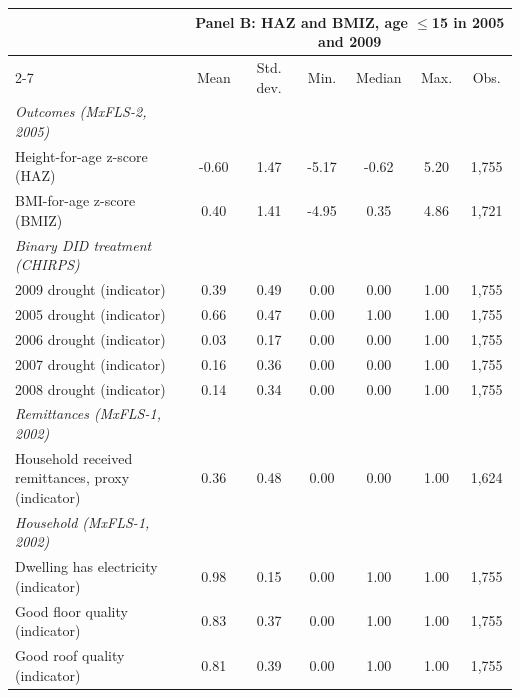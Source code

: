 \documentclass[12pt]{article}
\begin{document}
\begin{longtable}{l*{6}{c}}
\bottomrule
\newpage
\toprule
 & \multicolumn{6}{c}{Panel B: HAZ and BMIZ, age \ensuremath{\le}15 in 2005 and 2009}\\
\cmidrule(lr){2-7}
                    &        Mean&   Std. dev.&        Min.&      Median&        Max.&        Obs.\\
\midrule
\textit{Outcomes (MxFLS-2, 2005)}&            &            &            &            &            &            \\
Height-for-age z-score (HAZ)&       -0.60&        1.47&       -5.17&       -0.62&        5.20&       1,755\\
BMI-for-age z-score (BMIZ)&        0.40&        1.41&       -4.95&        0.35&        4.86&       1,721\\
\addlinespace[6pt]\textit{Binary DID treatment (CHIRPS)}&            &            &            &            &            &            \\
2009 drought (indicator)&        0.39&        0.49&        0.00&        0.00&        1.00&       1,755\\
2005 drought (indicator)&        0.66&        0.47&        0.00&        1.00&        1.00&       1,755\\
2006 drought (indicator)&        0.03&        0.17&        0.00&        0.00&        1.00&       1,755\\
2007 drought (indicator)&        0.16&        0.36&        0.00&        0.00&        1.00&       1,755\\
2008 drought (indicator)&        0.14&        0.34&        0.00&        0.00&        1.00&       1,755\\
\addlinespace[6pt]\textit{Remittances (MxFLS-1, 2002)}&            &            &            &            &            &            \\
Household received remittances, proxy (indicator)&        0.36&        0.48&        0.00&        0.00&        1.00&       1,624\\
\addlinespace[6pt]\textit{Household (MxFLS-1, 2002)}&            &            &            &            &            &            \\
Dwelling has electricity (indicator)&        0.98&        0.15&        0.00&        1.00&        1.00&       1,755\\
Good floor quality (indicator)&        0.83&        0.37&        0.00&        1.00&        1.00&       1,755\\
Good roof quality (indicator)&        0.81&        0.39&        0.00&        1.00&        1.00&       1,755\\

\end{longtable}
\end{document}
